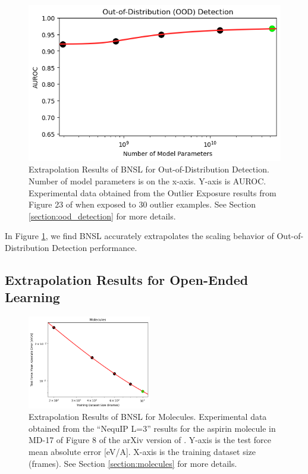 \documentclass{article} %
\begin{document}
\begin{figure}[htbp]
    \centering
\includegraphics[width=1.0\textwidth]{figures/ood_detection/ood_detection.png}
    \caption{
Extrapolation Results of BNSL for Out-of-Distribution Detection. Number of model parameters is on the x-axis. Y-axis is AUROC. Experimental data obtained from the Outlier Exposure results from Figure 23 of \cite{bai2022training} when exposed to 30 outlier examples. See Section \ref{section:ood_detection} for more details.
    }
    \label{fig:ood_detection}
\end{figure}

In Figure \ref{fig:ood_detection}, we find BNSL accurately extrapolates the scaling behavior of Out-of-Distribution Detection performance.

\clearpage

\iffalse
\subsection{Extrapolation Results for Open-Ended Learning}
\label{section:open-ended}

\begin{figure}[htbp]
    \centering
\includegraphics[width=0.48\textwidth]{figures/molecules/molecules.png}
    \caption{
Extrapolation Results of BNSL for Molecules. Experimental data obtained from the ``NequIP L=3'' results for the aspirin molecule in MD-17 of Figure 8 of the arXiv version of \cite{Batzner_2022}. Y-axis is the test force mean absolute error [eV/A]. X-axis is the training dataset size (frames). See Section \ref{section:molecules} for more details.
    }
    \label{fig:molecules}
\end{figure}
\end{document}
